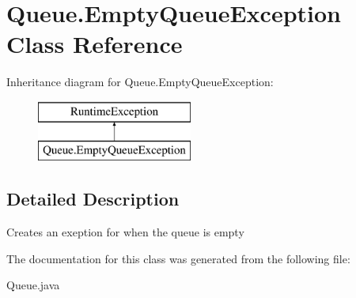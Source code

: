 \hypertarget{class_queue_1_1_empty_queue_exception}{}\section{Queue.\+Empty\+Queue\+Exception Class Reference}
\label{class_queue_1_1_empty_queue_exception}
Inheritance diagram for Queue.\+Empty\+Queue\+Exception\+:\begin{figure}[H]
\begin{center}
\leavevmode
\includegraphics[height=2.000000cm]{class_queue_1_1_empty_queue_exception}
\end{center}
\end{figure}


\subsection{Detailed Description}
Creates an exeption for when the queue is empty 

The documentation for this class was generated from the following file\+:\begin{DoxyCompactItemize}
\item 
Queue.\+java\end{DoxyCompactItemize}
